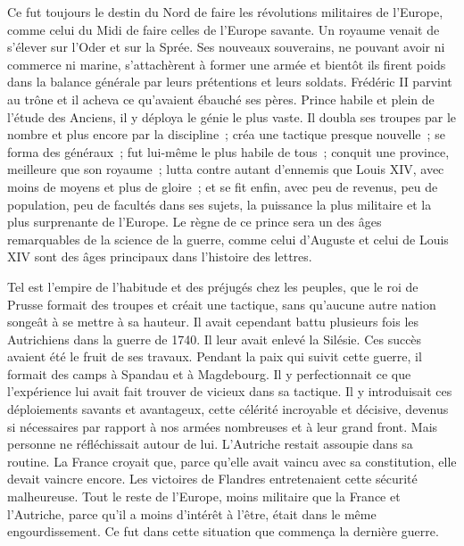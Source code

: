 \documentclass[french,twoside]{book} %
\begin{document}
Ce fut toujours le destin du Nord de faire les révolutions militaires de l’Europe, comme celui du Midi de faire celles de l’Europe savante. Un royaume venait de s’élever sur l’Oder et sur la Sprée. Ses nouveaux souverains, ne pouvant avoir ni commerce ni marine, s’attachèrent à former une armée et bientôt ils firent poids dans la balance générale par leurs prétentions et leurs soldats. Frédéric II parvint au trône et il acheva ce qu’avaient ébauché ses pères. Prince habile et plein de l’étude des Anciens, il y déploya le génie le plus vaste. Il doubla ses troupes par le nombre et plus encore par la discipline ; créa une tactique presque nouvelle ; se forma des généraux ; fut lui-même le plus habile de tous ; conquit une province, meilleure que son royaume ; lutta contre autant d’ennemis que Louis XIV, avec moins de moyens et plus de gloire ; et se fit enfin, avec peu de revenus, peu de population, peu de facultés dans ses sujets, la puissance la plus militaire et la plus surprenante de l’Europe. Le règne de ce prince sera un des âges remarquables de la science de la guerre, comme celui d’Auguste et celui de Louis XIV sont des âges principaux dans l’histoire des lettres.\par
Tel est l’empire de l’habitude et des préjugés chez les peuples, que le roi de Prusse formait des troupes et créait une tactique, sans qu’aucune autre nation songeât à se mettre à sa hauteur. Il avait cependant battu plusieurs fois les Autrichiens dans la guerre de 1740. Il leur avait enlevé la Silésie. Ces succès avaient été le fruit de ses travaux. Pendant la paix qui suivit cette guerre, il formait des camps à Spandau et à Magdebourg. Il y perfectionnait ce que l’expérience lui avait fait trouver de vicieux dans sa tactique. Il y introduisait ces déploiements savants et avantageux, cette célérité incroyable et décisive, devenus si nécessaires par rapport à nos armées nombreuses et à leur grand front. Mais personne ne réfléchissait autour de lui. L’Autriche restait assoupie dans sa routine. La France croyait que, parce qu’elle avait vaincu avec sa constitution, elle devait vaincre encore. Les victoires de Flandres entretenaient cette sécurité malheureuse. Tout le reste de l’Europe, moins militaire que la France et l’Autriche, parce qu’il a moins d’intérêt à l’être, était dans le même engourdissement. Ce fut dans cette situation que commença la dernière guerre.\par
\end{document}
